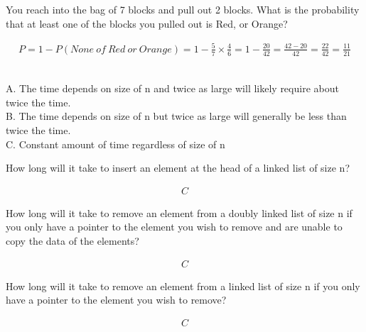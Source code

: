 \documentclass[12pt]{article}
\newenvironment{sol}[1][Solution]{\begin{trivlist}
\item[\hskip\labelsep {\bfseries #1:}]}{\end{trivlist}}
\begin{document}
\begin{enumerate}
    \item You reach into the bag of 7 blocks and pull out 2 blocks. What is the probability that at least one of the blocks you pulled out is Red, or Orange?
    \begin{sol}
        \begin{align*}
        P = 1 - P(None \ of \ Red \ or \ Orange) = 1- \frac{5}{7} \times \frac{4}{6}=1-\frac{20}{42} = \frac{42-20}{42} = \frac{22}{42} = \frac{11}{21}
        \end{align*}
    \end{sol}
~\\


A. The time depends on size of n and twice as large will likely require about twice the time.\\
B. The time depends on size of n but twice as large will generally be less than twice the time.\\
C. Constant amount of time regardless of size of n\\



    \item How long will it take to insert an element at the head of a linked list of size n?
    \begin{sol}
        \begin{align*}
        C
        \end{align*}
    \end{sol}

    

    \item How long will it take to remove an element from a doubly linked list of size n if you only have a pointer to the element you wish to remove and are unable to copy the data of the elements?
    \begin{sol}
        \begin{align*}
            C
        \end{align*}
    \end{sol}


    \item How long will it take to remove an element from a linked list of size n if you only have a pointer to the element you wish to remove?
    \begin{sol}
        \begin{align*}
        C
        \end{align*}
    \end{sol}


\end{enumerate}
\end{document}
